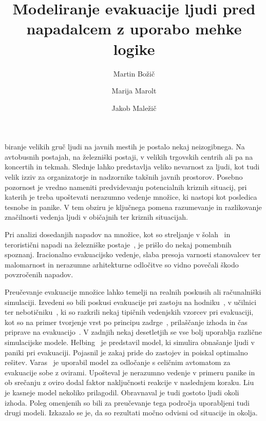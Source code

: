 \documentclass[9pt]{pnas-new}
\title{Modeliranje evakuacije ljudi pred napadalcem z uporabo mehke logike}
\author{Martin Božič}
\author{Marija Marolt}
\author{Jakob Maležič}
\affil{Poročilo seminarske naloge pri predmetu Skupinsko vedenje}
\affil{Github projekta: https://github.com/Blarc/crowd-evacuation}
\begin{document}
\verticaladjustment{-2pt}

\maketitle
\thispagestyle{firststyle}

biranje velikih gruč ljudi na javnih mestih je postalo nekaj neizogibnega. Na avtobusnih postajah, na železniški postaji, v velikih trgovskih centrih ali pa na koncertih in tekmah. Slednje lahko predstavlja veliko nevarnost za ljudi, kot tudi velik izziv za organizatorje in nadzornike takšnih javnih prostorov. Posebno pozornost je vredno nameniti predvidevanju potencialnih kriznih situacij, pri katerih je treba upoštevati nerazumno vedenje množice, ki nastopi kot posledica tesnobe in panike. V tem obziru je ključnega pomena razumevanje in razlikovanje značilnosti vedenja ljudi v običajnih ter kriznih situacijah.

Pri analizi dosedanjih napadov na množice, kot so streljanje v šolah~\cite{shootingWiki} in teroristični napadi na železniške postaje~\cite{CunmingWiki}, je prišlo do nekaj pomembnih spoznanj. Iracionalno evakuacijsko vedenje, slaba presoja varnosti stanovalcev ter malomarnost in nerazumne arhitekturne odločitve so vidno povečali škodo povzročenih napadov.

Preučevanje evakuacije množice lahko temelji na realnih poskusih ali računalniški simulaciji. Izvedeni so bili poskusi evakuacije pri zastoju na hodniku~\cite{bottlenecks2005}, v učilnici~\cite{classroom2008} ter nebotičniku~\cite{building2012}, ki so razkrili nekaj tipičnih vedenjskih vzorcev pri evakuaciji, kot so na primer tvorjenje vrst po principu zadrge~\cite{bottlenecks2005}, prilaščanje izhoda in čas priprave na evakuacijo~\cite{classroom2008}. V zadnjih nekaj desetletjih se vse bolj uporablja različne simulacijske modele. Helbing~\cite{Helbing2000} je predstavil model, ki simulira obnašanje ljudi v paniki pri evakuaciji. Pojasnil je zakaj pride do zastojev in poiskal optimalno rešitev. Varas~\cite{Varas2007} je uporabil model za odločanje s celičnim avtomatom za evakuacije sobe z ovirami. Upošteval je nerazumno vedenje v primeru panike in ob srečanju z oviro dodal faktor naključnosti reakcije v naslednjem koraku. Liu~\cite{Liu2009} je kasneje model nekoliko prilagodil. Obravnaval je tudi gostoto ljudi okoli izhoda. Poleg omenjenih so bili za preučevanje tega področja uporabljeni tudi drugi modeli. Izkazalo se je, da so rezultati močno odvisni od situacije in okolja.
\end{document}

